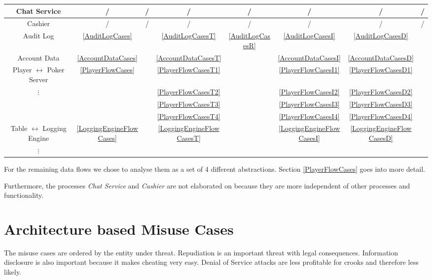 \documentclass[a4paper,11pt]{report}
\begin{document}
\begin{center}
\begin{tabular}{| c || c || c | c | c | c | c | c |}
  Chat Service 		& /			& / 	& /	& / 	& / 	& / 	& /	\\\hline
  Cashier 		& /			& / 	& /	& / 	& / 	& / 	& /	\\\hline
  \hline
  Audit Log 		& \ref{AuditLogCases}		& 	& \ref{AuditLogCasesT}	& \ref{AuditLogCasesR} 	& \ref{AuditLogCasesI} 	& \ref{AuditLogCasesD}	& 	\\\hline
  Account Data 		& \ref{AccountDataCases}	& 	& \ref{AccountDataCasesT}	&  	& \ref{AccountDataCasesI} 	& \ref{AccountDataCasesD}	& 	\\\hline
  \hline
  Player $\leftrightarrow$
  Poker Server 		& \ref{PlayerFlowCases}		&	& \ref{PlayerFlowCasesT1}	&	& \ref{PlayerFlowCasesI1}	& \ref{PlayerFlowCasesD1}	&\\
  $\vdots$		& 				&	& \ref{PlayerFlowCasesT2}	&	& \ref{PlayerFlowCasesI2}	& \ref{PlayerFlowCasesD2}	&	\\
  			&				&	& \ref{PlayerFlowCasesT3}	&	& \ref{PlayerFlowCasesI3}	& \ref{PlayerFlowCasesD3}	\\
  			&				&	& \ref{PlayerFlowCasesT4}	&	& \ref{PlayerFlowCasesI4}	& \ref{PlayerFlowCasesD4}	\\\hline
  Table $\leftrightarrow$
  Logging Engine 	& \ref{LoggingEngineFlowCases}	&	& \ref{LoggingEngineFlowCasesT}	&	& \ref{LoggingEngineFlowCasesI}	& \ref{LoggingEngineFlowCasesD}	&	\\
  $\vdots$		& 				&	& 	&	& 	& 	&	\\\hline
\end{tabular}
\end{center}
\vspace{0.3cm}

For the remaining data flows we chose to analyse them as a set of 4 different abstractions. Section \ref{PlayerFlowCases} goes into more detail.

Furthermore, the processes \textit{Chat Service} and \textit{Cashier} are not elaborated on because they are more independent of other processes and functionality.

\section{Architecture based Misuse Cases}
\label{MisUseCases}

The misuse cases are ordered by the entity under threat. Repudiation is an important threat with legal consequences. Information disclosure is also important because it makes cheating very easy. Denial of Service attacks are less profitable for crooks and therefore less likely.
\end{document}
